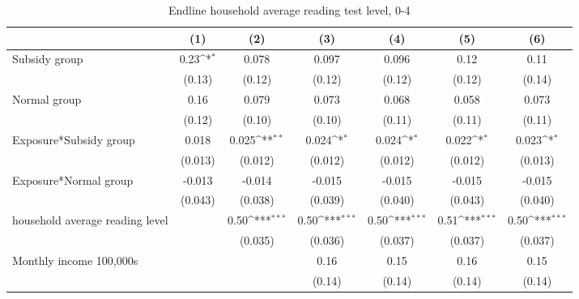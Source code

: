 \begin{table}[htbp]\centering
\def\sym#1{\ifmmode^{#1}\else\(^{#1}\)\fi}
\caption{Endline household average reading test level, 0-4}
\begin{tabular*}{1\hsize}{@{\hskip\tabcolsep\extracolsep\fill}l*{6}{c}}
\toprule
                &\multicolumn{1}{c}{(1)}         &\multicolumn{1}{c}{(2)}         &\multicolumn{1}{c}{(3)}         &\multicolumn{1}{c}{(4)}         &\multicolumn{1}{c}{(5)}         &\multicolumn{1}{c}{(6)}         \\
\midrule
Subsidy group   &     0.23\sym{*}  &    0.078         &    0.097         &    0.096         &     0.12         &     0.11         \\
                &   (0.13)         &   (0.12)         &   (0.12)         &   (0.12)         &   (0.12)         &   (0.14)         \\
Normal group    &     0.16         &    0.079         &    0.073         &    0.068         &    0.058         &    0.073         \\
                &   (0.12)         &   (0.10)         &   (0.10)         &   (0.11)         &   (0.11)         &   (0.11)         \\
Exposure*Subsidy group&    0.018         &    0.025\sym{**} &    0.024\sym{*}  &    0.024\sym{*}  &    0.022\sym{*}  &    0.023\sym{*}  \\
                &  (0.013)         &  (0.012)         &  (0.012)         &  (0.012)         &  (0.012)         &  (0.013)         \\
Exposure*Normal group&   -0.013         &   -0.014         &   -0.015         &   -0.015         &   -0.015         &   -0.015         \\
                &  (0.043)         &  (0.038)         &  (0.039)         &  (0.040)         &  (0.043)         &  (0.040)         \\
household average reading level&                  &     0.50\sym{***}&     0.50\sym{***}&     0.50\sym{***}&     0.51\sym{***}&     0.50\sym{***}\\
                &                  &  (0.035)         &  (0.036)         &  (0.037)         &  (0.037)         &  (0.037)         \\
Monthly income 100,000s&                  &                  &     0.16         &     0.15         &     0.16         &     0.15         \\
                &                  &                  &   (0.14)         &   (0.14)         &   (0.14)         &   (0.14)         \\

\end{tabular*}
\end{table}
